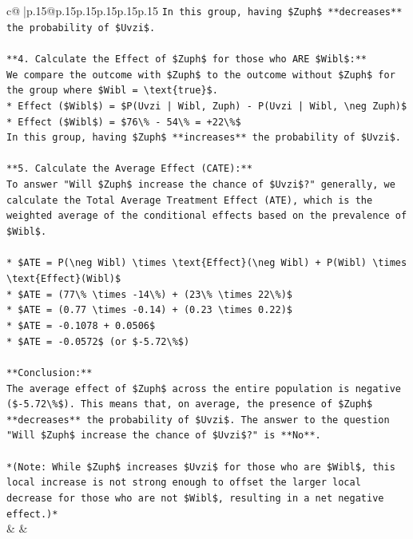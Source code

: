 \documentclass{article}
\begin{document}
{\begin{supertabular}{c@{$\;$}|p{.15\linewidth}@{}p{.15\linewidth}p{.15\linewidth}p{.15\linewidth}p{.15\linewidth}p{.15\linewidth}}
{{{\texttt{In this group, having \$Zuph\$ **decreases** the probability of \$Uvzi\$.} \\
\\ 
\texttt{**4. Calculate the Effect of \$Zuph\$ for those who ARE \$Wibl\$:**} \\
\texttt{We compare the outcome with \$Zuph\$ to the outcome without \$Zuph\$ for the group where \$Wibl = \textbackslash{}text\{true\}\$.} \\
\texttt{*   Effect (\$Wibl\$) = \$P(Uvzi | Wibl, Zuph) {-} P(Uvzi | Wibl, \textbackslash{}neg Zuph)\$} \\
\texttt{*   Effect (\$Wibl\$) = \$76\textbackslash{}\% {-} 54\textbackslash{}\% = +22\textbackslash{}\%\$} \\
\texttt{In this group, having \$Zuph\$ **increases** the probability of \$Uvzi\$.} \\
\\ 
\texttt{**5. Calculate the Average Effect (CATE):**} \\
\texttt{To answer "Will \$Zuph\$ increase the chance of \$Uvzi\$?" generally, we calculate the Total Average Treatment Effect (ATE), which is the weighted average of the conditional effects based on the prevalence of \$Wibl\$.} \\
\\ 
\texttt{*   \$ATE = P(\textbackslash{}neg Wibl) \textbackslash{}times \textbackslash{}text\{Effect\}(\textbackslash{}neg Wibl) + P(Wibl) \textbackslash{}times \textbackslash{}text\{Effect\}(Wibl)\$} \\
\texttt{*   \$ATE = (77\textbackslash{}\% \textbackslash{}times {-}14\textbackslash{}\%) + (23\textbackslash{}\% \textbackslash{}times 22\textbackslash{}\%)\$} \\
\texttt{*   \$ATE = (0.77 \textbackslash{}times {-}0.14) + (0.23 \textbackslash{}times 0.22)\$} \\
\texttt{*   \$ATE = {-}0.1078 + 0.0506\$} \\
\texttt{*   \$ATE = {-}0.0572\$ (or \${-}5.72\textbackslash{}\%\$)} \\
\\ 
\texttt{**Conclusion:**} \\
\texttt{The average effect of \$Zuph\$ across the entire population is negative (\${-}5.72\textbackslash{}\%\$). This means that, on average, the presence of \$Zuph\$ **decreases** the probability of \$Uvzi\$. The answer to the question "Will \$Zuph\$ increase the chance of \$Uvzi\$?" is **No**.} \\
\\ 
\texttt{*(Note: While \$Zuph\$ increases \$Uvzi\$ for those who are \$Wibl\$, this local increase is not strong enough to offset the larger local decrease for those who are not \$Wibl\$, resulting in a net negative effect.)*} \\
            }
        }
    }
    & & \\ \\


\end{supertabular}}
\end{document}
